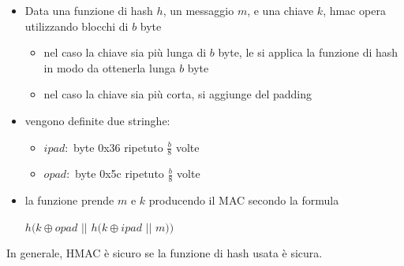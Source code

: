 \begin{itemize}
    \item Data una funzione di hash $h$, un messaggio $m$, e una chiave $k$, hmac opera utilizzando 
    blocchi di $b$ byte
    \begin{itemize}
        \item nel caso la chiave sia più lunga di $b$ byte, le si applica la funzione di hash in modo 
        da ottenerla lunga $b$ byte 
        \item nel caso la chiave sia più corta, si aggiunge del padding 
    \end{itemize}
    \item vengono definite due stringhe:
    \begin{itemize}
        \item $ipad:$ byte 0x36 ripetuto $\frac{b}{8}$ volte
        \item $opad:$ byte 0x5c ripetuto $\frac{b}{8}$ volte
    \end{itemize}
    \item la funzione prende $m$ e $k$ producendo il MAC secondo la formula 
    \begin{center}
        $h(k \oplus opad$  $||$ $h(k \oplus ipad$ $||$ $m))$
    \end{center}
\end{itemize}
\noindent 

\noindent In generale, HMAC è sicuro se la funzione di hash usata è sicura.


